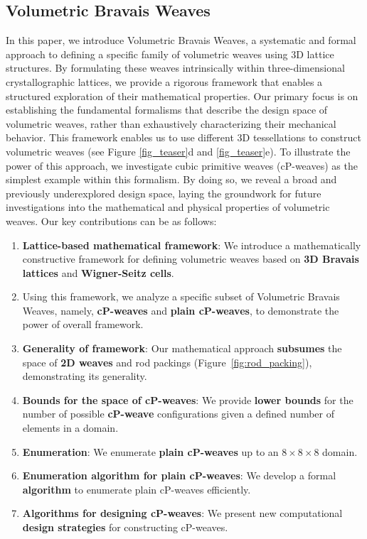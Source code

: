 \documentclass[unnumsec,webpdf,contemporary,large]{oup-authoring-template}%
\theoremstyle{thmstyleone}%
\theoremstyle{thmstyletwo}%
\theoremstyle{thmstylethree}%
\begin{document}
{\subsection{Volumetric Bravais Weaves}

In this paper, we introduce Volumetric Bravais Weaves, a systematic and formal approach to defining a specific family of volumetric weaves using 3D lattice structures. By formulating these weaves intrinsically within three-dimensional crystallographic lattices, we provide a rigorous framework that enables a structured exploration of their mathematical properties. Our primary focus is on establishing the fundamental formalisms that describe the design space of volumetric weaves, rather than exhaustively characterizing their mechanical behavior. This framework enables us to use different 3D tessellations to construct volumetric weaves (see Figure \ref{fig_teaser}d and \ref{fig_teaser}e). To illustrate the power of this approach, we investigate cubic primitive weaves (cP-weaves) as the simplest example within this formalism. By doing so, we reveal a broad and previously underexplored design space, laying the groundwork for future investigations into the mathematical and physical properties of volumetric weaves. Our key contributions can be as follows:

\begin{enumerate}
    \item \textbf{Lattice-based mathematical framework}: We introduce a mathematically constructive framework for defining volumetric weaves based on \textbf{3D Bravais lattices} and \textbf{Wigner-Seitz cells}. 
    \item Using this framework, we analyze a specific subset of Volumetric Bravais Weaves, namely, \textbf{cP-weaves} and \textbf{plain cP-weaves}, to demonstrate the power of overall framework.
    \item \textbf{Generality of framework}: Our mathematical approach \textbf{subsumes} the space of \textbf{2D weaves} and rod packings (Figure~\ref{fig:rod_packing}), demonstrating its generality.
    \item \textbf{Bounds for the space of cP-weaves}: We provide \textbf{lower bounds} for the number of possible \textbf{cP-weave} configurations given a defined number of elements in a domain.
    \item \textbf{Enumeration}: We enumerate \textbf{plain cP-weaves} up to an $8\times8\times8$ domain.
    \item \textbf{Enumeration algorithm for plain cP-weaves}: We develop a formal \textbf{algorithm} to enumerate plain cP-weaves efficiently.
    \item \textbf{Algorithms for designing cP-weaves}: We present new computational \textbf{design strategies} for constructing cP-weaves.
\end{enumerate}
}
\end{document}
